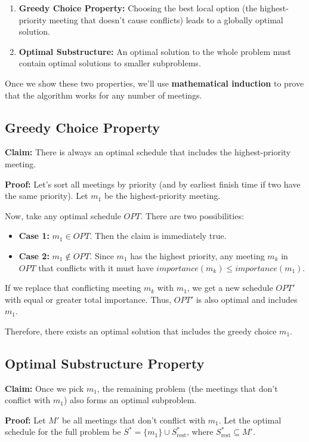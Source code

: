 \documentclass[conference]{IEEEtran}
\begin{document}
\begin{enumerate}
    \item \textbf{Greedy Choice Property:} Choosing the best local option (the highest-priority meeting that doesn’t cause conflicts) leads to a globally optimal solution.
    \item \textbf{Optimal Substructure:} An optimal solution to the whole problem must contain optimal solutions to smaller subproblems.
\end{enumerate}

Once we show these two properties, we’ll use \textbf{mathematical induction} to prove that the algorithm works for any number of meetings.

\subsection{Greedy Choice Property}

\textbf{Claim:} There is always an optimal schedule that includes the highest-priority meeting.

\textbf{Proof:}  
Let’s sort all meetings by priority (and by earliest finish time if two have the same priority).  
Let $m_1$ be the highest-priority meeting.

Now, take any optimal schedule $OPT$. There are two possibilities:

\begin{itemize}
    \item \textbf{Case 1:} $m_1 \in OPT$. Then the claim is immediately true.
    \item \textbf{Case 2:} $m_1 \notin OPT$. Since $m_1$ has the highest priority, any meeting $m_k$ in $OPT$ that conflicts with it must have 
    $importance(m_k) \le importance(m_1)$.
\end{itemize}

If we replace that conflicting meeting $m_k$ with $m_1$, we get a new schedule $OPT'$ with equal or greater total importance.  
Thus, $OPT'$ is also optimal and includes $m_1$.  

Therefore, there exists an optimal solution that includes the greedy choice $m_1$.
\subsection{Optimal Substructure Property}
\textbf{Claim:} Once we pick $m_1$, the remaining problem (the meetings that don’t conflict with $m_1$) also forms an optimal subproblem.

\textbf{Proof:}  
Let $M'$ be all meetings that don’t conflict with $m_1$.  
Let the optimal schedule for the full problem be $S^* = \{m_1\} \cup S^*_{\text{rest}}$, where $S^*_{\text{rest}} \subseteq M'$.
\end{document}
